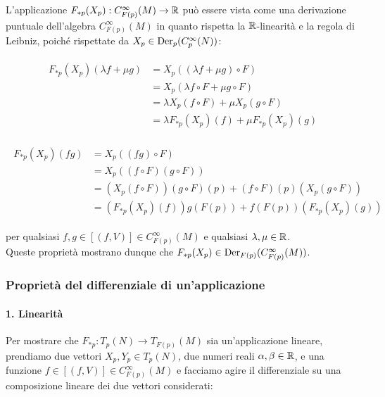 L'applicazione $ F_{*p}(X_{p}) : C_{F(p)}^{\infty}(M) \to \mathbb{R} $ può essere vista come una derivazione puntuale dell'algebra $ C_{F(p)}^{\infty}(M) $ in quanto rispetta la $ \mathbb{R} $-linearità e la regola di Leibniz, poiché rispettate da $ X_{p} \in \operatorname{Der}_{p}(C_{p}^{\infty}(N)) $:

\begin{align}
	\begin{split}
		F_{*p}(X_{p})(\lambda f + \mu g) &= X_{p}((\lambda f + \mu g) \circ F) \\
		&= X_{p}(\lambda f \circ F + \mu g \circ F) \\
		&= \lambda X_{p}(f \circ F) + \mu X_{p}(g \circ F) \\
		&= \lambda F_{*p}(X_{p})(f) + \mu F_{*p}(X_{p})(g)
	\end{split}
\end{align}

\begin{align}
	\begin{split}
		F_{*p}(X_{p})(f g) &= X_{p}((f g) \circ F) \\
		&= X_{p}((f \circ F) (g \circ F)) \\
		&= \left( X_{p}(f \circ F) \right) (g \circ F)(p) + (f \circ F)(p) \left( X_{p}(g \circ F) \right) \\
		&= \left( F_{*p}(X_{p})(f) \right) g(F(p)) + f(F(p)) \left( F_{*p}(X_{p})(g) \right)
	\end{split}
\end{align}

per qualsiasi $ f, g \in [(f,V)] \in C_{F(p)}^{\infty}(M) $ e qualsiasi $ \lambda, \mu \in \mathbb{R} $. \\
Queste proprietà mostrano dunque che $ F_{*p}(X_{p}) \in \operatorname{Der}_{F(p)}(C_{F(p)}^{\infty}(M)) $.

\subsubsection{Proprietà del differenziale di un'applicazione}

\paragraph{1. Linearità}

Per mostrare che $ F_{*p} : T_{p}(N) \to T_{F(p)}(M) $ sia un'applicazione lineare, prendiamo due vettori $ X_{p},Y_{p} \in T_{p}(N) $, due numeri reali $ \alpha,\beta \in \mathbb{R} $, e una funzione $ f \in [(f,V)] \in C_{F(p)}^{\infty}(M) $ e facciamo agire il differenziale su una composizione lineare dei due vettori considerati:

